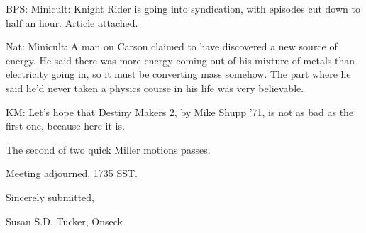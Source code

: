 \documentclass[12pt]{article}
\begin{document}
BPS: Minicult: Knight Rider is going into syndication, with episodes cut down to half an hour. Article attached.

Nat: Minicult: A man on Carson claimed to have discovered a new source of energy. He said there was more energy coming out of his mixture of metals than electricity going in, so it must be converting mass somehow. The part where he said he'd never taken a physics course in his life was very believable.

KM: Let's hope that Destiny Makers 2, by Mike Shupp '71, is not as bad as the first one, because here it is.

The second of two quick Miller motions passes.

\vspace{12pt}

\noindent
Meeting adjourned, 1735 SST.

\vspace{18pt}

\centerline{Sincerely submitted,}
\centerline{Susan S.D. Tucker, Onseck}
\end{document}
